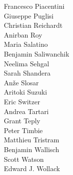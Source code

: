 \documentclass[PICOReport.tex]{subfiles}
\begin{document}
{\begin{multicols}{4}
Francesco Piacentini            \\
Giuseppe Puglisi                \\
Christian Reichardt             \\
Anirban Roy                     \\
Maria Salatino                  \\
Benjamin Saliwanchik            \\
Neelima Sehgal                  \\
Sarah Shandera                  \\
An\v{z}e Slosar                 \\
Aritoki Suzuki                  \\
Eric Switzer                    \\
Andrea Tartari                  \\
Grant Teply                     \\
Peter Timbie                    \\
Matthieu Tristram               \\
Benjamin Wallisch               \\
Scott Watson                    \\
Edward J. Wollack               
\end{multicols}

}
\end{document}
